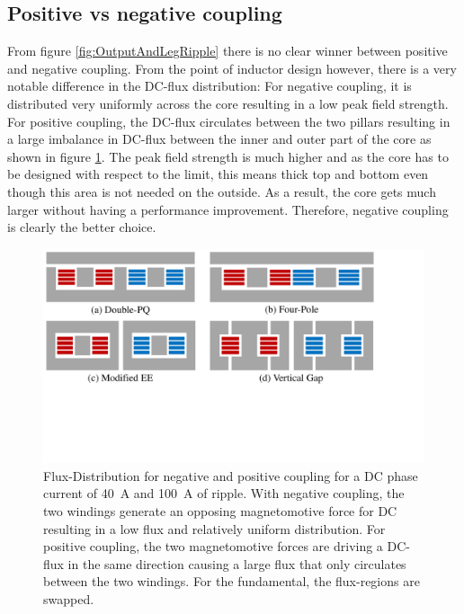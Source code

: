 \documentclass{IPEC2026}
\newcommand{\sbl}[1]{\glssymbol{#1}}
\begin{document}
\subsection{Positive vs negative coupling}
From figure \ref{fig:OutputAndLegRipple} there is no clear winner between positive and negative coupling. From the point of inductor design however, there is a very notable difference in the DC-flux distribution: For negative coupling, it is distributed very uniformly across the core resulting in a low peak field strength. For positive coupling, the DC-flux circulates between the two pillars resulting in a large imbalance in DC-flux between the inner and outer part of the core as shown in figure \ref{fig:Fluxposneg}. The peak field strength is much higher and as the core has to be designed with respect to the \sbl{Hdc} limit, this means thick top and bottom even though this area is not needed on the outside. As a result, the core gets much larger without having a performance improvement. Therefore, negative coupling is clearly the better choice. \par  

\begin{figure}
  \includegraphics[page=5, trim = 0cm 1cm 3.5cm 0cm, clip, width=\columnwidth]{figures/IPEC_Figures_PowerPoint.pdf}
  \caption{Flux-Distribution for negative and positive coupling for a DC phase current of \qty{40}{\A} and \qty{100}{\A} of ripple. With negative coupling, the two windings generate an opposing magnetomotive force for DC resulting in a low flux and relatively uniform distribution. For positive coupling, the two magnetomotive forces are driving a DC-flux in the same direction causing a large flux that only circulates between the two windings. For the fundamental, the flux-regions are swapped.}
  \label{fig:Fluxposneg}
\end{figure}
\end{document}
